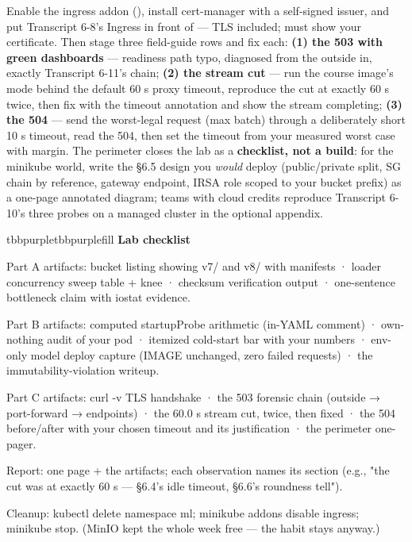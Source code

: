 Enable the ingress addon (), install cert-manager with a self-signed issuer, and put Transcript 6-8's Ingress in front of  — TLS included;  must show your certificate. Then stage three field-guide rows and fix each: \textbf{(1) the 503 with green dashboards} — readiness path typo, diagnosed from the outside in, exactly Transcript 6-11's chain; \textbf{(2) the stream cut} — run the course image's  mode behind the default 60 s proxy timeout, reproduce the cut at exactly 60 s twice, then fix with the timeout annotation and show the stream completing; \textbf{(3) the 504} — send the worst-legal request (max batch) through a deliberately short 10 s timeout, read the 504, then set the timeout from your measured worst case with margin. The perimeter closes the lab as a \textbf{checklist, not a build}: for the minikube world, write the §6.5 design you \textit{would} deploy (public/private split, SG chain by reference, gateway endpoint, IRSA role scoped to your bucket prefix) as a one-page annotated diagram; teams with cloud credits reproduce Transcript 6-10's three probes on a managed cluster in the optional appendix.

\begin{calloutbox}{tbbpurple}{tbbpurplefill}
{\normalsize\bfseries\color{tbbpurple}Lab checklist}\par\vspace{3pt}
\begin{tbbitemize}
  \item Part A artifacts: bucket listing showing v7/ and v8/ with manifests · loader concurrency sweep table + knee · checksum verification output · one-sentence bottleneck claim with iostat evidence.
  \item Part B artifacts: computed startupProbe arithmetic (in-YAML comment) · own-nothing audit of your pod · itemized cold-start bar with your numbers · env-only model deploy capture (IMAGE unchanged, zero failed requests) · the immutability-violation writeup.
  \item Part C artifacts: curl -v TLS handshake · the 503 forensic chain (outside → port-forward → endpoints) · the 60.0 s stream cut, twice, then fixed · the 504 before/after with your chosen timeout and its justification · the perimeter one-pager.
  \item Report: one page + the artifacts; each observation names its section (e.g., "the cut was at exactly 60 s — §6.4's idle timeout, §6.6's roundness tell").
  \item Cleanup: kubectl delete namespace ml; minikube addons disable ingress; minikube stop. (MinIO kept the whole week free — the habit stays anyway.)
\end{tbbitemize}
\end{calloutbox}

